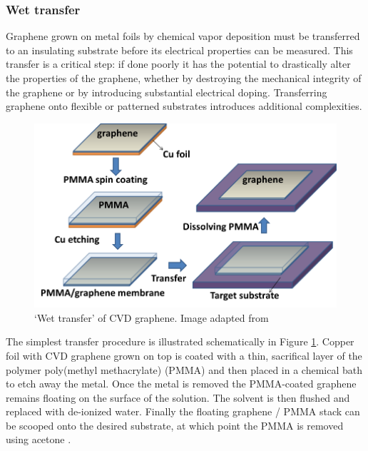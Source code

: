 \documentclass[edeposit,fullpage,draftthesis]{uiucthesis2009}
\begin{document}
            \subsubsection{Wet transfer}
            
            Graphene grown on metal foils by chemical vapor deposition must be transferred to 
        an insulating substrate before its electrical properties can be measured.
        This transfer is a critical step: if done poorly it has the potential to 
        drastically alter the properties of the graphene, whether by destroying
        the mechanical integrity of the graphene or by introducing substantial electrical doping.
        Transferring graphene onto flexible or patterned substrates introduces additional
        complexities. 
        
        \begin{figure}
            \centering
            \includegraphics[width=0.8\linewidth]{images/experimentaltechniques/wettransfer.png}
            \caption[Mechanical exfoliation of graphene]{
                `Wet transfer' of CVD graphene.
                Image adapted from \cite{kumar2013synthesis}}
            \label{fig:wettransfer}
            \end{figure}

        The simplest transfer procedure is illustrated schematically in Figure \ref{fig:wettransfer}.
        Copper foil with CVD graphene grown on top is coated with a thin, sacrifical layer of the 
        polymer poly(methyl methacrylate) (PMMA) and then placed in a chemical
        bath to etch away the metal. Once the metal is removed the PMMA-coated graphene 
        remains floating on the surface of the solution. The solvent is then flushed and replaced
        with de-ionized water.
        Finally the floating graphene / PMMA stack can be
        scooped onto the desired substrate, at which point the PMMA is removed using acetone
        \cite{reina2008large, kim2009large, li2009large}.
        
\end{document}
